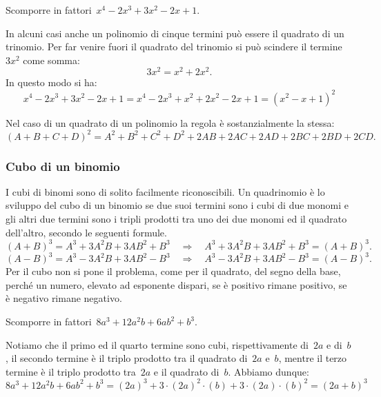  \begin{esempio}
Scomporre in fattori~\(x^{4}-2x^{3}+3x^{2}-2x+1\).

In alcuni casi anche un polinomio di cinque termini può essere il quadrato di 
un trinomio.
Per far venire fuori il quadrato del trinomio si può scindere il 
termine~\(3x^{2}\) come somma:
\[3x^{2}=x^{2}+2x^{2}.\]
In questo modo si ha:
\[x^{4}-2x^{3}+3x^{2}-2x+1=x^{4}-2x^{3}+x^{2}+2x^{2}-2x+1=(x^{2}-x+1)^{2}\]
 \end{esempio}

Nel caso di un quadrato di un polinomio la regola è sostanzialmente la stessa:
\begin{equation*}
(A+B+C+D)^{2}=A^{2}+B^{2}+C^{2}+D^{2}+2AB+2AC+2AD+2BC+2BD+2CD.
\end{equation*}

\subsubsection{Cubo di un binomio}
\label{subsubsec:divpol_cubobin}

I cubi di binomi sono di solito facilmente riconoscibili. Un quadrinomio è lo 
sviluppo del cubo di un binomio se due suoi termini sono i cubi di due monomi 
e gli altri due termini sono i tripli prodotti tra uno dei due monomi ed il 
quadrato dell'altro, secondo le seguenti formule.
\begin{equation*}
(A+B)^{3}=A^{3}+3A^{2}B+3AB^{2}+B^{3}\quad \Rightarrow \quad 
A^{3}+3A^{2}B+3AB^{2}+B^{3}=(A+B)^{3}.
\end{equation*}
\begin{equation*}
(A-B)^{3}=A^{3}-3A^{2}B+3AB^{2}-B^{3}\quad \Rightarrow \quad 
A^{3}-3A^{2}B+3AB^{2}-B^{3}=(A-B)^{3}.
\end{equation*}
Per il cubo non si pone il problema, come per il quadrato, del segno della 
base, perché un numero, elevato ad esponente dispari, se è positivo rimane 
positivo, se è negativo rimane negativo.

 \begin{esempio}
Scomporre in fattori~\(8a^{3}+12a^{2}b+6{ab}^{2}+b^{3}\).

Notiamo che il primo ed il quarto termine sono cubi, rispettivamente di~\(2a\) e 
di~\(b\), il secondo termine è il triplo prodotto tra il quadrato di~\(2a\) e~\(b\), 
mentre il terzo termine è il triplo prodotto tra~\(2a\) e il quadrato di~\(b\).
Abbiamo dunque:
\[8a^{3}+12a^{2}b+6ab^{2}+b^{3}=
  (2a)^{3}+3\cdot (2a)^{2}\cdot (b)+3\cdot (2a)\cdot (b)^{2}=(2a+b)^{3}\]
 \end{esempio}

